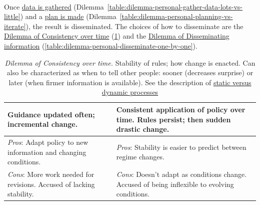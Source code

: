 

\ \\

Once \hyperref[table:dilemma-personal-gather-data-lots-vs-little]{data is gathered} (Dilemma~\ref{table:dilemma-personal-gather-data-lots-vs-little}) and a \hyperref[table:dilemma-personal-planning-vs-iterate]{plan is made} (Dilemma~\ref{table:dilemma-personal-planning-vs-iterate}), the result is disseminated. The choices of how to disseminate are the \hyperref[table:dilemma-personal-consistency-gradual-stepwise]{Dilemma of Consistency over time} (\ref{table:dilemma-personal-consistency-gradual-stepwise}) and the \hyperref[table:dilemma-personal-disseminate-one-by-one]{Dilemma of Disseminating information} (\ref{table:dilemma-personal-disseminate-one-by-one}).

\begin{center}
\begin{table}[H] %
\begin{tabular}{ | m{\dilemmatablewidth}| m{\dilemmatablewidth} | } 
  \hline
  \textbf{Guidance updated often; incremental change.} & 
  \textbf{Consistent application of policy over time. Rules persist; then sudden drastic change.} \\ 
  \hline
  \textit{Pros}: Adapt policy to new information and changing conditions. &
  \textit{Pros}: Stability is easier to predict between regime changes.  \\
  \hline
  \textit{Cons}: More work needed for revisions. Accused of lacking stability. & 
  \textit{Cons}: Doesn't adapt as conditions change. Accused of being inflexible to evolving conditions. \\
  \hline
\end{tabular}
\caption{
\textit{Dilemma of Consistency over time.} 
Stability of rules; how change is enacted. Can also be characterized as when to tell other people: sooner (decreases surprise) or later (when firmer information is available).
See the description of \hyperref[sec:static-dynamic-processes]{static versus dynamic processes}\iftoggle{haspagenumbers}{ on page~\pageref{sec:static-dynamic-processes}.}{.}
}
\label{table:dilemma-personal-consistency-gradual-stepwise}
\end{table}
\end{center}

